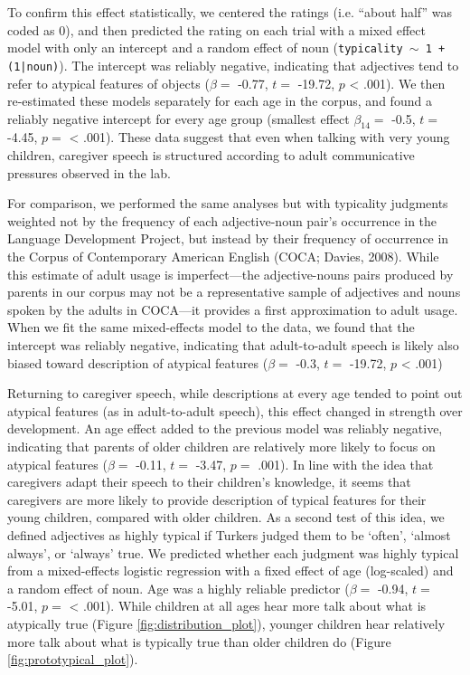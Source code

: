\documentclass[10pt, letterpaper]{article}
\begin{document}
To confirm this effect statistically, we centered the ratings (i.e.
``about half'' was coded as 0), and then predicted the rating on each
trial with a mixed effect model with only an intercept and a random
effect of noun (\texttt{typicality $\sim$ 1 + (1|noun)}). The intercept
was reliably negative, indicating that adjectives tend to refer to
atypical features of objects (\(\beta =\) -0.77, \(t =\) -19.72, \(p\)
\textless{} .001). We then re-estimated these models separately for each
age in the corpus, and found a reliably negative intercept for every age
group (smallest effect \(\beta_{14} =\) -0.5, \(t =\) -4.45, \(p =\)
\textless{} .001). These data suggest that even when talking with very
young children, caregiver speech is structured according to adult
communicative pressures observed in the lab.

For comparison, we performed the same analyses but with typicality
judgments weighted not by the frequency of each adjective-noun pair's
occurrence in the Language Development Project, but instead by their
frequency of occurrence in the Corpus of Contemporary American English
(COCA; Davies, 2008). While this estimate of adult usage is
imperfect---the adjective-nouns pairs produced by parents in our corpus
may not be a representative sample of adjectives and nouns spoken by the
adults in COCA---it provides a first approximation to adult usage. When
we fit the same mixed-effects model to the data, we found that the
intercept was reliably negative, indicating that adult-to-adult speech
is likely also biased toward description of atypical features
(\(\beta =\) -0.3, \(t =\) -19.72, \(p\) \textless{} .001)

Returning to caregiver speech, while descriptions at every age tended to
point out atypical features (as in adult-to-adult speech), this effect
changed in strength over development. An age effect added to the
previous model was reliably negative, indicating that parents of older
children are relatively more likely to focus on atypical features
(\(\beta =\) -0.11, \(t =\) -3.47, \(p =\) .001). In line with the idea
that caregivers adapt their speech to their children's knowledge, it
seems that caregivers are more likely to provide description of typical
features for their young children, compared with older children. As a
second test of this idea, we defined adjectives as highly typical if
Turkers judged them to be `often', `almost always', or `always' true. We
predicted whether each judgment was highly typical from a mixed-effects
logistic regression with a fixed effect of age (log-scaled) and a random
effect of noun. Age was a highly reliable predictor (\(\beta =\) -0.94,
\(t =\) -5.01, \(p =\) \textless{} .001). While children at all ages
hear more talk about what is atypically true (Figure
\ref{fig:distribution_plot}), younger children hear relatively more talk
about what is typically true than older children do (Figure
\ref{fig:prototypical_plot}).
\end{document}
